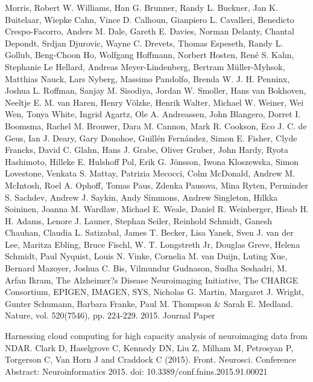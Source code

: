 \documentclass[twocolumn]{bmcart}%
\begin{document}
\begin{backmatter}
Morris, Robert W. Williams, Han G. Brunner, Randy L. Buckner, Jan K. Buitelaar, Wiepke Cahn, Vince D. Calhoun, Gianpiero L. Cavalleri, Benedicto Crespo-Facorro, Anders M. Dale, Gareth E. Davies, Norman Delanty, Chantal Depondt, Srdjan Djurovic, Wayne C. Drevets, Thomas Espeseth, Randy L. Gollub, Beng-Choon Ho, Wolfgang Hoffmann, Norbert Hosten, René S. Kahn, Stephanie Le Hellard, Andreas Meyer-Lindenberg, Bertram Müller-Myhsok, Matthias Nauck, Lars Nyberg, Massimo Pandolfo, Brenda W. J. H. Penninx, Joshua L. Roffman, Sanjay M. Sisodiya, Jordan W. Smoller, Hans van Bokhoven, Neeltje E. M. van Haren, Henry Völzke, Henrik Walter, Michael W. Weiner, Wei Wen, Tonya White, Ingrid Agartz, Ole A. Andreassen, John Blangero, Dorret I. Boomsma, Rachel M. Brouwer, Dara M. Cannon, Mark R. Cookson, Eco J. C. de Geus, Ian J. Deary, Gary Donohoe, Guillén Fernández, Simon E. Fisher, Clyde Francks, David C. Glahn, Hans J. Grabe, Oliver Gruber, John Hardy, Ryota Hashimoto, Hilleke E. Hulshoff Pol, Erik G. Jönsson, Iwona Kloszewska, Simon Lovestone, Venkata S. Mattay, Patrizia Mecocci, Colm McDonald, Andrew M. McIntosh, Roel A. Ophoff, Tomas Paus, Zdenka Pausova, Mina Ryten, Perminder S. Sachdev, Andrew J. Saykin, Andy Simmons, Andrew Singleton, Hilkka Soininen, Joanna M. Wardlaw, Michael E. Weale, Daniel R. Weinberger, Hieab H. H. Adams, Lenore J. Launer, Stephan Seiler, Reinhold Schmidt, Ganesh Chauhan, Claudia L. Satizabal, James T. Becker, Lisa Yanek, Sven J. van der Lee, Maritza Ebling, Bruce Fischl, W. T. Longstreth Jr, Douglas Greve, Helena Schmidt, Paul Nyquist, Louis N. Vinke, Cornelia M. van Duijn, Luting Xue, Bernard Mazoyer, Joshua C. Bis, Vilmundur Gudnason, Sudha Seshadri, M. Arfan Ikram, The Alzheimer?s Disease Neuroimaging Initiative, The CHARGE Consortium, EPIGEN, IMAGEN, SYS, Nicholas G. Martin, Margaret J. Wright, Gunter Schumann, Barbara Franke, Paul M. Thompson & Sarah E. Medland. Nature, vol. 520(7546), pp. 224-229. 2015. Journal Paper

Harnessing cloud computing for high capacity analysis of neuroimaging data from NDAR. Clark D, Haselgrove C, Kennedy DN, Liu Z, Milham M, Petrosyan P, Torgerson C, Van Horn J and Craddock C (2015). Front. Neurosci. Conference Abstract: Neuroinformatics 2015. doi: 10.3389/conf.fnins.2015.91.00021
\end{backmatter}
\end{document}
